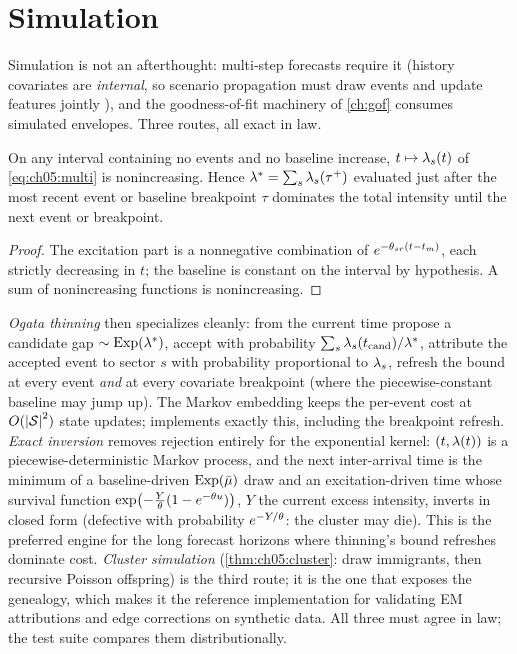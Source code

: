 \section{Simulation}\label{ch05:sec:simulation}

Simulation is not an afterthought: multi-step forecasts require it
(history covariates are \emph{internal}, so scenario propagation must
draw events and update features jointly \citep{kalbfleisch2002}), and the
goodness-of-fit machinery of \cref{ch:gof} consumes simulated envelopes.
Three routes, all exact in law.

\begin{lemma}\label{lem:ch05:thinning}
On any interval containing no events and no baseline increase, $t \mapsto
\lambda_s(t)$ of \cref{eq:ch05:multi} is nonincreasing. Hence
$\lambda^{*} = \sum_s \lambda_s(\tau^{+})$ evaluated just after the most recent
event or baseline breakpoint $\tau$ dominates the total intensity until
the next event or breakpoint.
\end{lemma}

\begin{proof}
The excitation part is a nonnegative combination of $e^{-\theta_{sr}(t -
t_m)}$, each strictly decreasing in $t$; the baseline is constant on the
interval by hypothesis. A sum of nonincreasing functions is nonincreasing.
\end{proof}

\emph{Ogata thinning} \citep{lewisshedler1979,ogata1981} then
specializes cleanly: from the current time propose a candidate gap
$\sim\mathrm{Exp}(\lambda^{*})$, accept with probability
$\sum_s\lambda_s(t_{\mathrm{cand}})/\lambda^{*}$, attribute the accepted event
to sector $s$ with probability proportional to $\lambda_s$, refresh the bound
at every event \emph{and} at every covariate breakpoint (where the
piecewise-constant baseline may jump up). The Markov embedding keeps the
per-event cost at $O(\left|\mathcal{S}\right|^2)$ state updates;
 implements exactly this, including the
breakpoint refresh. \emph{Exact inversion} \citep{dassioszhao2013}
removes rejection entirely for the exponential kernel: $(t, \lambda(t))$ is
a piecewise-deterministic Markov process, and the next inter-arrival time
is the minimum of a baseline-driven $\mathrm{Exp}(\bar{\mu})$ draw and an
excitation-driven time whose survival function
$\exp\!\big({-}\tfrac{Y}{\theta}(1 - e^{-\theta u})\big)$, $Y$ the current
excess intensity, inverts in closed form (defective with probability
$e^{-Y/\theta}$: the cluster may die). This is the preferred engine for
the long forecast horizons where thinning's bound refreshes dominate cost.
\emph{Cluster simulation} (\cref{thm:ch05:cluster}: draw immigrants, then
recursive Poisson offspring) is the third route; it is the one that
exposes the genealogy, which makes it the reference implementation for
validating EM attributions and edge corrections on synthetic data. All
three must agree in law; the test suite compares them distributionally.

